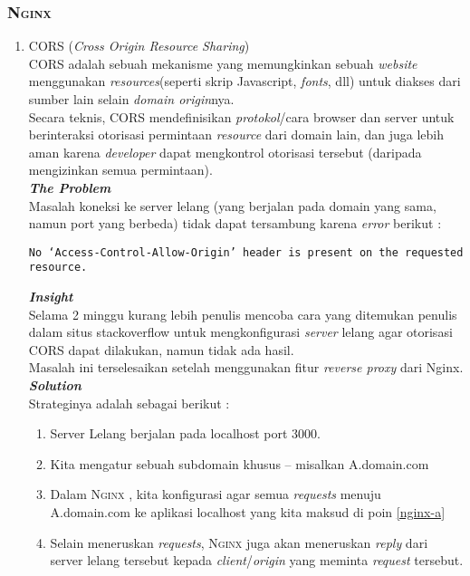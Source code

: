 \subsubsection{\textsc{Nginx}}

\begin{enumerate}
	\item CORS (\textit{Cross Origin Resource Sharing})
	\\
	\indentenum CORS adalah sebuah mekanisme yang memungkinkan  sebuah \textit{website} menggunakan \textit{resources}(seperti skrip Javascript, \textit{fonts}, dll) untuk diakses dari sumber lain selain \textit{domain origin}nya.\\ 
	\indentenum Secara teknis, CORS mendefinisikan \textit{protokol}/cara browser dan server untuk berinteraksi otorisasi permintaan \textit{resource} dari domain lain, dan juga lebih aman karena \textit{developer} dapat mengkontrol otorisasi tersebut (daripada mengizinkan semua permintaan).\\
	
	\textbf{\textit{The Problem}} \\
	\indentenum  Masalah koneksi ke server lelang (yang berjalan pada domain yang sama, namun port yang berbeda) tidak dapat tersambung karena \textit{error} berikut :
	\begin{lstlisting}[style=htmlcssjs]
		No ‘Access-Control-Allow-Origin’ header is present on the requested resource.
	\end{lstlisting}
	
	
	\textbf{\textit{Insight}} \\
	\indentenum Selama 2 minggu kurang lebih penulis mencoba cara yang ditemukan penulis dalam situs stackoverflow untuk mengkonfigurasi \textit{server} lelang agar otorisasi CORS dapat dilakukan, namun tidak ada hasil.\\
	\indent Masalah ini terselesaikan setelah menggunakan fitur \textit{reverse proxy} dari Nginx.\\
	
	
	\textbf{\textit{Solution}} \\
	\indentenum Strateginya adalah sebagai berikut :
	\begin{enumerate}
		\item \label{nginx-a} Server Lelang berjalan pada localhost port 3000.
		\item \label{nginx-b} Kita mengatur sebuah subdomain khusus -- misalkan A.domain.com
		\item Dalam \textsc{Nginx} , kita konfigurasi agar semua \textit{requests} menuju A.domain.com ke aplikasi localhost yang kita maksud di poin \ref{nginx-a}
		\item Selain meneruskan \textit{requests}, \textsc{Nginx} juga akan meneruskan \textit{reply} dari server lelang tersebut kepada \textit{client}/\textit{origin} yang meminta \textit{request} tersebut.				
	\end{enumerate}
\end{enumerate}